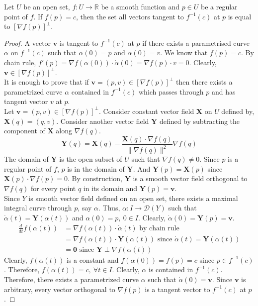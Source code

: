 \begin{theorem}
	Let $U$ be an open set, $f : U \to \mathbb{R}$ be a smooth function and $p \in U$ be a regular point of $f$.
	If $f(p)=c$, then the set all vectors tangent to $f^{-1}(c)$ at $p$ is equal to $[\nabla f(p)]^\perp$.
\end{theorem}
\begin{proof}
	A vector $\boldsymbol{v}$ is tangent to $f^{-1}(c)$ at $p$ if there exists a parametrised curve $\alpha$ on $f^{-1}(c)$ such that $\alpha(0) = p$ and $\dot\alpha(0)=v$.  We know that $f(p) = c$. By chain rule, $f'(p) = \nabla f(\alpha(0)) \cdot \dot\alpha(0) = \nabla f(p) \cdot v = 0$. Clearly, $\boldsymbol{v} \in [\nabla f(p)]^\perp$.\\

	It is enough to prove that if $\boldsymbol{v} = (p,v) \in [\nabla f(p)]^\perp$ then there exists a parametrized curve $\alpha$ contained in $f^{-1}(c)$ which passes through $p$ and has tangent vector $v$ at $p$.\\

	Let $\boldsymbol{v} = (p,v) \in [\nabla f(p)]^\perp$. Consider constant vector field $\boldsymbol{X}$ on $U$ defined by, $\boldsymbol{X}(q) = (q,v)$. Consider another vector field $\boldsymbol{Y}$ defined by subtracting the component of $\boldsymbol{X}$ along $\nabla f(q)$.
	$$\boldsymbol{Y}(q) = \boldsymbol{X}(q) - \frac{\boldsymbol{X}(q) \cdot \nabla f(q)}{\| \nabla f(q) \|^2} \nabla f(q)$$
	The domain of $\boldsymbol{Y}$ is the open subset of $U$ such that $\nabla f(q) \ne 0$. Since $p$ is a regular point of $f$, $p$ is in the domain of $\boldsymbol{Y}$. And $\boldsymbol{Y}(p) = \boldsymbol{X}(p)$ since $\boldsymbol{X}(p) \cdot \nabla f(p) = 0$. By construction, $\boldsymbol{Y}$ is a smooth vector field orthogonal to $\nabla f(q)$ for every point $q$ in its domain and $\boldsymbol{Y}(p) = \boldsymbol{v}$.\\

	Since $Y$ is smooth vector field defined on an open set, there exists a maximal integral curve through $p$, say $\alpha$. Thus, $\alpha : I \to \mathscr{D}(Y)$ such that $\dot\alpha(t)=\boldsymbol{Y}(\alpha(t))$ and $\alpha(0)=p,\ 0 \in I$. Clearly, $\dot\alpha(0)=\boldsymbol{Y}(p) = \boldsymbol{v}$.
	\begin{align*}
		\frac{d}{dt} f(\alpha(t)) 
		& = \nabla f(\alpha(t)) \cdot \dot\alpha(t) \text{ by chain rule }\\
		& = \nabla f(\alpha(t)) \cdot \boldsymbol{Y}(\alpha(t)) \text{ since } \dot\alpha(t) = \boldsymbol{Y}(\alpha(t)) \\
		& = \boldsymbol{0} \text{ since }\boldsymbol{Y} \perp \nabla f(\alpha(t))
	\end{align*}
	Clearly, $f(\alpha(t))$ is a constant and $f(\alpha(0)) = f(p) = c$ since $p \in f^{-1}(c)$. Therefore, $f(\alpha(t)) = c,\ \forall t \in I$. Clearly, $\alpha$ is contained in $f^{-1}(c)$. Therefore, there exists a parametrized curve $\alpha$ such that $\dot\alpha(0) = \boldsymbol{v}$. Since $\boldsymbol{v}$ is arbitrary, every vector orthogonal to $\nabla f(p)$ is a tangent vector to $f^{-1}(c)$ at $p$.
\end{proof}


